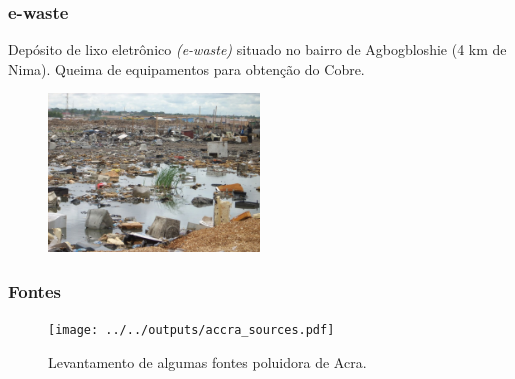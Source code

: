 \begin{frame}
  \frametitle{e-waste}
  Depósito de lixo eletrônico \textit{(e-waste)} situado no bairro 
  de Agbogbloshie (4 km de Nima). Queima de equipamentos para obtenção do Cobre. 
  \begin{figure}[H]
    \centering
    \includegraphics[width=0.5\textwidth]{../../inputs/images/ewaste_jack_caravano.jpg}
  \end{figure}
\end{frame}

\begin{frame}
	\frametitle{Fontes}
	\begin{figure}[H]
		\centering	
		\texttt{[image: ../../outputs/accra\_sources.pdf]}
		\caption{Levantamento de algumas fontes poluidora de Acra.
			\label{fg:acrasources}}
	\end{figure}
\end{frame}
